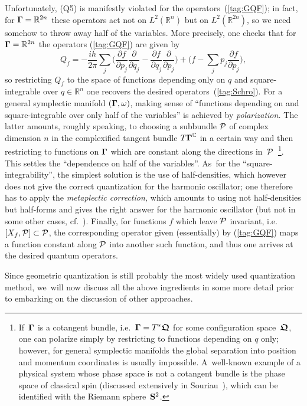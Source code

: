 \documentclass[11pt]{amsart}
\numberwithin{equation}{section}
\theoremstyle{remark}
\newcommand\Omg{{\bigam}}   %
\newcommand\PP{{\Cal P}}
\newcommand\RR{\mathbb R}
\newcommand{\CC}{\C}
\newcommand{\bigam}{\mbox{\boldmath $\Gamma$}}
\newcommand{\bfrakQ}{\mbox{\boldmath $\mathfrak Q$}}
\newcommand{\C}{\mathbb C}
\begin{document}
Unfortunately, (Q5) is manifestly violated for the operators~(\ref{tag:GQF});
in fact, for $\Omg=\RR^{2n}$ these operators act not on $L^2(\RR^n)$ but on
$L^2(\RR^{2n})$, so we need somehow to throw away half of the variables. More
precisely, one checks that for $\Omg=\RR^{2n}$ the operators (\ref{tag:GQF})
are given by
$$ Q_f = -\frac{ih}{2\pi} \sum_j \bigg(
\frac{\partial f}{\partial p_j} \frac\partial{\partial q_j} -
\frac{\partial f}{\partial q_j} \frac\partial{\partial p_j} \bigg)
+ \bigg(f-\sum_j p_j \frac{\partial f}{\partial p_j} \bigg) ,  $$
so restricting $Q_f$ to the space of functions depending only on $q$ and
square-integrable over $q\in\RR^n$ one recovers the desired
operators~(\ref{tag:Schro}). For a general symplectic manifold $(\Omg,\omega)$,
making sense of ``functions depending on and square-integrable over only half
of the variables'' is achieved by {\sl polarization.\/} The latter amounts,
roughly speaking, to choosing a subbundle $\PP$ of complex dimension $n$ in the
complexified tangent bundle $T\Omg^\CC$ in a certain way and then restricting
to functions on $\Omg$ which are constant along the directions
in~$\PP$~\footnote{If~$\Omg$ is a cotangent bundle, i.e.~$\Omg=T^*\bfrakQ$ for
some configuration space~$\bfrakQ$, one can polarize simply by restricting to
functions depending on $q$ only; however, for general symplectic manifolds the
global separation into position and momentum coordinates is usually impossible.
A~well-known example of a physical system whose phase space is not a cotangent
bundle is the phase space of classical spin (discussed extensively in
Souriau~\cite{bib:SouSD}),
which can be identified with the Riemann sphere~$\bold S^2$.}. This settles the
``dependence on half of the variables''. As~for the ``square-integrability'',
the simplest solution is the use of half-densities, which however does not give
the correct quantization for the harmonic oscillator; one therefore has to
apply the {\sl metaplectic correction,\/} which amounts to using not
half-densities but half-forms
and gives the right answer for the
harmonic oscillator (but not in some other cases, cf.~\cite{bib:TuyWis}).
Finally, for functions $f$ which leave $\PP$ invariant, i.e.~$[X_f,\PP]\subset
\PP$, the corresponding operator given (essentially) by (\ref{tag:GQF}) maps a
function constant along $\PP$ into another such function, and thus one arrives
at the desired quantum operators.

Since geometric quantization is still probably the most widely used
quantization method, we~will now discuss all the above ingredients in some
more detail prior to embarking on the discussion of other approaches.
\end{document}
